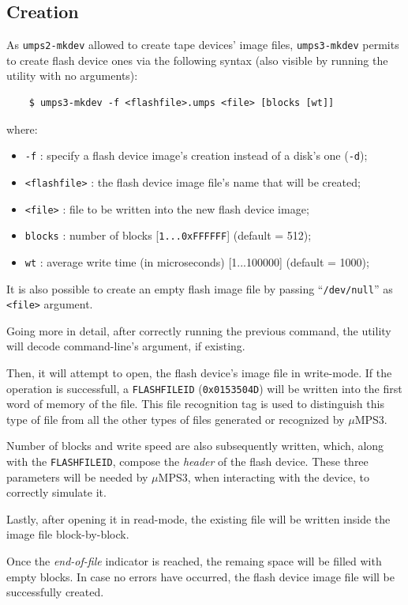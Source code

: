 \documentclass[12pt,a4paper,openright,twoside]{report}
\begin{document}
\subsection{Creation}
As \texttt{umps2-mkdev} allowed to create tape devices' image files, \texttt{umps3-mkdev} permits to create flash device ones via the following syntax (also visible by running the utility with no arguments):
\begin{verbatim}
	$ umps3-mkdev -f <flashfile>.umps <file> [blocks [wt]]
	\end{verbatim}
where:
\begin{itemize}
	\item	\texttt{-f} : specify a flash device image's creation instead of a disk's one (\texttt{-d});
	\item	\texttt{<flashfile>} : the flash device image file's name that will be created;
	\item	\texttt{<file>} : file to be written into the new flash device image;
	\item	\texttt{blocks} : number of blocks [\texttt{1...0xFFFFFF}] (default = 512);
	\item	\texttt{wt} : average write time (in microseconds) [1...100000] (default = 1000);
\end{itemize}
It is also possible to create an empty flash image file by passing ``\texttt{/dev/null}'' as \texttt{<file>} argument.

Going more in detail, after correctly running the previous command, the utility will decode command-line's argument, if existing.

Then, it will attempt to open, the flash device's image file in write-mode.
If the operation is successfull, a \texttt{FLASHFILEID} (\texttt{0x0153504D}) will be written into the first word of memory of the file.
This file recognition tag is used to distinguish this type of file from all the other types of files generated or recognized by $\mu$MPS3.

Number of blocks and write speed are also subsequently written, which, along with the \texttt{FLASHFILEID}, compose the \textit{header} of the flash device.
These three parameters will be needed by $\mu$MPS3, when interacting with the device, to correctly simulate it.

Lastly, after opening it in read-mode, the existing file will be written inside the image file block-by-block.

Once the \textit{end-of-file} indicator is reached, the remaing space will be filled with empty blocks.
In case no errors have occurred, the flash device image file will be successfully created.
\end{document}
